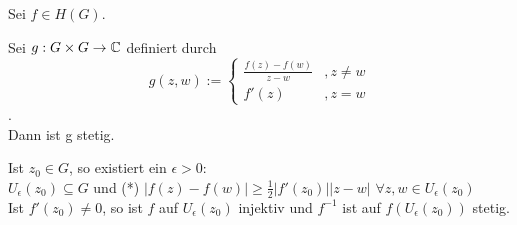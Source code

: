 \documentclass[a4paper,twoside,DIV15,BCOR12mm]{scrbook}
\begin{document}
\begin{satz}
Sei $f \in H(G)$.
\begin{liste}
\item Sei $g: G \times G \to \mathbb{C}$ definiert durch 
\[g(z,w):= \begin{cases} 
           \frac{f(z)-f(w)}{z-w}&, z \neq w \\
           f'(z)&, z = w
           \end{cases}\]. \\
Dann ist g stetig.
\item Ist $z_0 \in G$, so existiert ein $\epsilon > 0$: \\ $ U_\epsilon(z_0)
\subseteq G$ und (*) $|f(z)-f(w)| \geq \frac{1}{2}|f'(z_0)||z-w|$ $\forall z, w
\in U_\epsilon(z_0)$ \\ Ist $f'(z_0) \neq 0$, so ist $f$ auf $U_\epsilon(z_0)$
injektiv und $f^{-1}$ ist auf $f(U_{\epsilon}(z_0))$ stetig.

\end{liste}
\end{satz}
\end{document}
